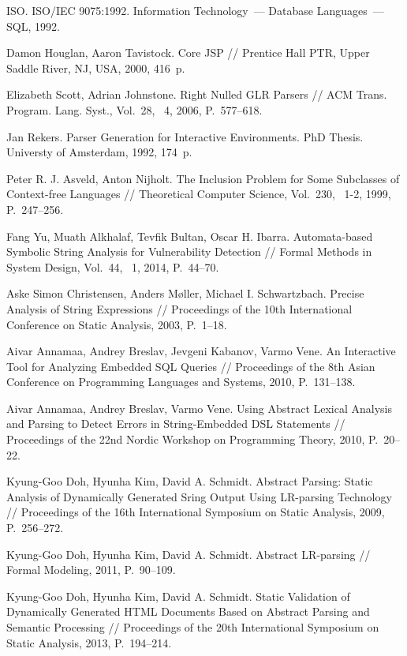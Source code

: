 \documentclass{llncs}
\begin{document}
%
%
\begin{thebibliography}{}
%
ISO. ISO/IEC 9075:1992. Information Technology~--- Database Languages~--- SQL, 1992.

Damon Houglan, Aaron Tavistock. Core JSP // Prentice Hall PTR, Upper Saddle River, NJ, USA, 2000, 416~p.

Elizabeth Scott, Adrian Johnstone.
Right Nulled GLR Parsers // ACM Trans. Program. Lang. Syst., Vol.~28, \textnumero~4,
2006, P.~577--618.

Jan Rekers.
Parser Generation for Interactive Environments. PhD Thesis. Universty of Amsterdam, 1992, 174~p.

Peter R. J. Asveld, Anton Nijholt.
The Inclusion Problem for Some Subclasses of Context-free Languages //
Theoretical Computer Science, Vol.~230, \textnumero~1-2, 1999, P.~247--256.

Fang Yu, Muath Alkhalaf, Tevfik Bultan, Oscar H. Ibarra.
Automata-based Symbolic String Analysis for Vulnerability Detection //
Formal Methods in System Design, Vol.~44, \textnumero~1, 2014, P.~44--70.

Aske Simon Christensen, Anders M{\o}ller, Michael I. Schwartzbach.
Precise Analysis of String Expressions //
Proceedings of the 10th International Conference on Static Analysis, 2003, P.~1--18.

Aivar Annamaa, Andrey Breslav, Jevgeni Kabanov, Varmo Vene.
An Interactive Tool for Analyzing Embedded SQL Queries //
Proceedings of the 8th Asian Conference on Programming Languages and Systems, 2010, P.~131--138.

Aivar Annamaa, Andrey Breslav, Varmo Vene. Using Abstract Lexical Analysis and Parsing to Detect 
Errors in String-Embedded DSL Statements // 
Proceedings of the 22nd Nordic Workshop on Programming Theory, 2010, P.~20--22. 

Kyung-Goo Doh, Hyunha Kim, David A. Schmidt. Abstract Parsing: Static Analysis of 
Dynamically Generated Sring Output Using LR-parsing Technology // 
Proceedings of the 16th International Symposium on Static Analysis, 2009, P.~256--272.

Kyung-Goo Doh, Hyunha Kim, David A. Schmidt. Abstract LR-parsing // Formal Modeling, 2011, P.~90--109.

Kyung-Goo Doh, Hyunha Kim, David A. Schmidt. Static Validation of Dynamically Generated HTML 
Documents Based on Abstract Parsing and Semantic Processing // 
Proceedings of the 20th International Symposium on Static Analysis, 2013, P.~194--214.


\end{thebibliography}
\end{document}

